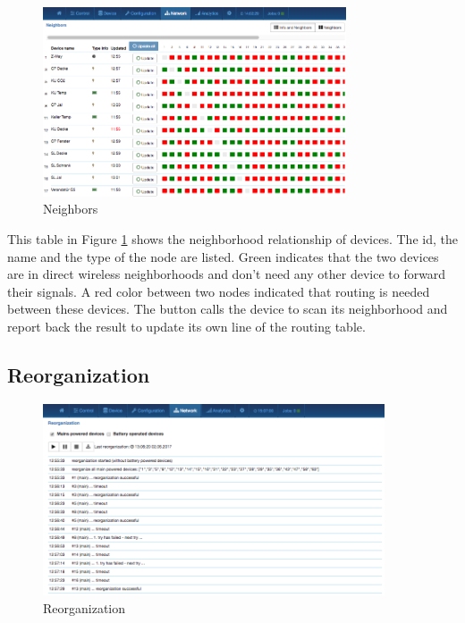 \begin{figure}
\begin{center}
\includegraphics[width=0.8\textwidth]{pngs/cap7/eui22.png}
\caption{Neighbors}
\label{eui22}
\end{center}
\end{figure}

This table in Figure \ref{eui22} shows the neighborhood relationship of devices. The id,
 the name and the type of the node are listed. Green indicates that the two devices are 
 in direct wireless neighborhoods and don’t need any other device to forward their signals.  
 A red color between two nodes indicated that routing is needed between these devices.  
 The  button calls the device to scan its neighborhood and report back the 
 result to update its own line of the routing table.

\subsection{Reorganization}

\begin{figure}
\begin{center}
\includegraphics[width=0.9\textwidth]{pngs/cap7/eui23.png}
\caption{Reorganization}
\label{eui23}
\end{center}
\end{figure}

